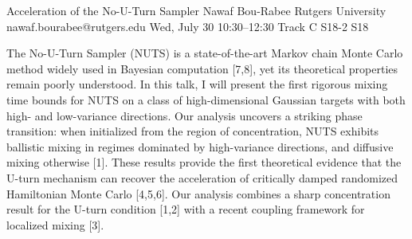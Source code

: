 \begin{talk}
  {Acceleration of the No-U-Turn Sampler}%
  {Nawaf Bou-Rabee}%
  {Rutgers University}%
  {nawaf.bourabee@rutgers.edu}%
  {}%
  {}%
  {Wed, July 30 10:30–12:30 Track C}%
  {S18-2}%
  {S18}%
  {}%
  
				
			

\medskip

The No-U-Turn Sampler (NUTS) is a state-of-the-art Markov chain Monte Carlo method widely used in Bayesian computation [7,8], yet its theoretical properties remain poorly understood. In this talk, I will present the first rigorous mixing time bounds for NUTS on a class of high-dimensional Gaussian targets with both high- and low-variance directions. Our analysis uncovers a striking phase transition: when initialized from the region of concentration, NUTS exhibits ballistic mixing in regimes dominated by high-variance directions, and diffusive mixing otherwise [1]. These results provide the first theoretical evidence that the U-turn mechanism can recover the acceleration of critically damped randomized Hamiltonian Monte Carlo [4,5,6].  Our analysis combines a sharp concentration result for the U-turn condition [1,2] with a recent coupling framework for localized mixing [3]. 


\end{talk}
